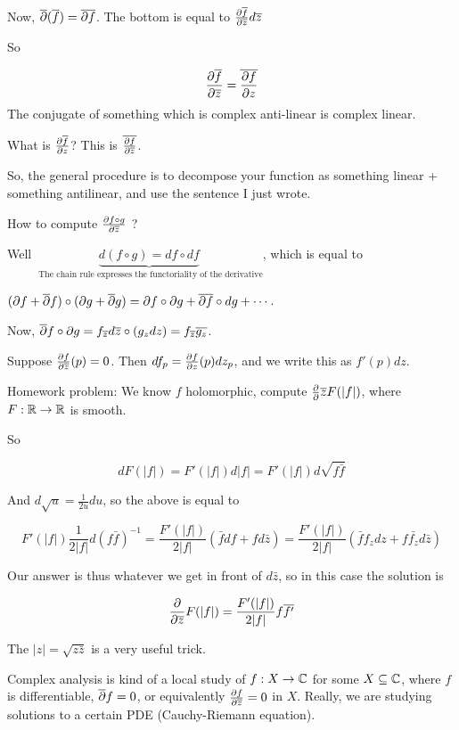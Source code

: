 \documentclass[x11names,reqno,14pt]{extarticle}
\begin{document}
Now, $\overline{\partial}(\overline{f}) = \overline{\partial f}$. The bottom is equal to $\frac{\partial \overline{f}}{\partial\overline{z}}d\overline{z}$

So 

\[
\frac{\partial \overline{f}}{\partial \overline{z}} = \overline{\frac{\partial f}{\partial z}}
\]
The conjugate of something which is complex anti-linear is complex linear. 

What is $\frac{\partial \overline{f}}{\partial z}$? This is $\overline{\frac{\partial f}{\partial \overline{z}}}$. 

So, the general procedure is to decompose your function as something linear + something antilinear, and use the sentence I just wrote. 

How to compute $\frac{\partial f\circ g}{\partial \overline{z}}$ ?

Well $\underbrace{d(f\circ g) = df \circ df}_{\text{ The chain rule expresses the functoriality of the derivative}}$, which is equal to 

$(\partial f + \overline{\partial}f)\circ(\partial g + \overline{\partial}g) = \partial f \circ \partial g + \overline{\partial f}\circ dg + \cdots$.

Now, $\overline{\partial}f\circ\partial g = f_{\overline{z}}d\overline{z}\circ(g_zdz) = f_{\overline{z}}\overline{g_z}$. 


Suppose $\frac{\partial f}{\partial \overline{z}}(p) = 0$. Then $df_p = \frac{\partial f}{\partial z}(p)dz_p$, and we write this as $f'(p)dz$. 

Homework problem: We know $f$ holomorphic, compute $\frac{\partial}{\partial}{\overline{z}}F(|f|)$, where $F:\mathbb{R}\to\mathbb{R}$ is smooth. 

So 

\[
dF(|f|) = F'(|f|)d|f| = F'(|f|)d\sqrt{f\bar{f}}
\]

And $d\sqrt{u} = \frac{1}{2u}du$, so the above is equal to 

\[
F'(|f|)\frac{1}{2|f|}d(f\bar{f})^{-1} = \frac{F'(|f|)}{2|f|}(\bar{f}df + fd\bar{z}) = \frac{F'(|f|)}{2|f|}(\bar{f}f_zdz + f\bar{f_z}d\bar{z})
\]

Our answer is thus whatever we get in front of $d\bar{z}$, so in this case the solution is 

\[
\frac{\partial}{\partial\overline{z}}F(|f|) = \frac{F'(|f|)}{2|f|}f\overline{f'}
\]

The $|z| = \sqrt{z\bar{z}}$ is a very useful trick. 

Complex analysis is kind of a local study of $f:X\to\mathbb{C}$ for some $X\subseteq\mathbb{C}$, where $f$ is differentiable, $\overline{\partial}f = 0$, or equivalently $\frac{\partial f}{\partial\overline{z}} = 0$ in $X$. Really, we are studying solutions to a certain PDE (Cauchy-Riemann equation). 
\end{document}
